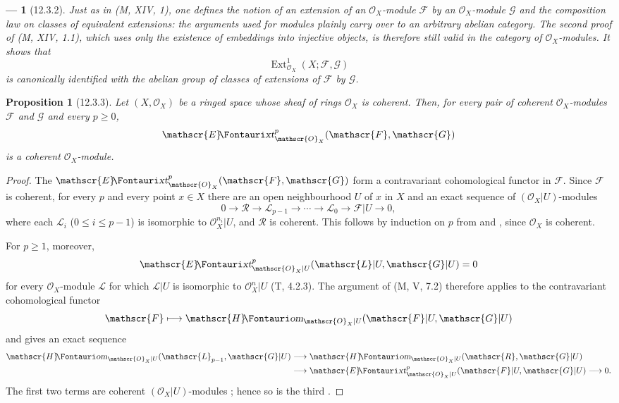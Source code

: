 \documentclass[oneside]{amsart}
\theoremstyle{ega-env-style}
\newtheorem*{env}{---}
\theoremstyle{ega-thm-env-style}
\newtheorem*{proposition}{Proposition}
\theoremstyle{ega-defn-env-style}
\def\mathcal{\mathscr}
\def\sh{\mathcal}                   %
\def\leq{\leqslant}                 %
\def\geq{\geqslant}                 %
\def\Ext{\operatorname{Ext}}
\def\shHom{\sh{H}\textup{\kern-2.2pt{\Fontauri\slshape om}}}   %
\def\shExt{\sh{E}\textup{\kern-2.2pt{\Fontauri\slshape xt}}}   %
\let\EGAOriginalLabel\label
\renewcommand{\label}[1]{\phantomsection\EGAOriginalLabel{#1}}
\begin{document}
\begin{env}[12.3.2]
\label{0.12.3.2}
Just as in (M, XIV, 1), one defines the notion of an
\emph{extension} of an $\sh{O}_X$-module $\sh{F}$ by an
$\sh{O}_X$-module $\sh{G}$ and the composition law on classes of
equivalent extensions: the arguments used for modules plainly carry
over to an arbitrary abelian category.
The second proof of (M, XIV, 1.1), which uses only the existence of
embeddings into injective objects, is therefore still valid in the
category of $\sh{O}_X$-modules.  It shows that
\[
  \Ext^1_{\sh{O}_X}(X;\sh{F},\sh{G})
\]
is canonically identified with the abelian group of classes of
extensions of $\sh{F}$ by $\sh{G}$.
\end{env}

\begin{proposition}[12.3.3]
\label{0.12.3.3}
Let $(X,\sh{O}_X)$ be a ringed space whose sheaf of rings
$\sh{O}_X$ is coherent.
Then, for every pair of coherent $\sh{O}_X$-modules $\sh{F}$ and
$\sh{G}$ and every $p\geq0$,
\[
  \shExt^p_{\sh{O}_X}(\sh{F},\sh{G})
\]
is a coherent $\sh{O}_X$-module.
\end{proposition}

\begin{proof}
The $\shExt^p_{\sh{O}_X}(\sh{F},\sh{G})$ form a contravariant
cohomological functor in $\sh{F}$.
Since $\sh{F}$ is coherent, for every $p$ and every point $x\in X$
there are an open neighbourhood $U$ of $x$ in $X$ and an exact
sequence of $(\sh{O}_X|U)$-modules
\[
  0\longrightarrow\sh{R}\longrightarrow\sh{L}_{p-1}
  \longrightarrow\cdots\longrightarrow\sh{L}_0
  \longrightarrow\sh{F}|U\longrightarrow0,
\]
where each $\sh{L}_i$ ($0\leq i\leq p-1$) is isomorphic to
$\sh{O}_X^{n_i}|U$, and $\sh{R}$ is coherent.
This follows by induction on $p$ from
 and
, since $\sh{O}_X$ is coherent.

For $p\geq1$, moreover,
\[
  \shExt^p_{\sh{O}_X|U}(\sh{L}|U,\sh{G}|U)=0
\]
for every $\sh{O}_X$-module $\sh{L}$ for which $\sh{L}|U$ is
isomorphic to $\sh{O}_X^n|U$ (T, 4.2.3).
The argument of (M, V, 7.2) therefore applies to the contravariant
cohomological functor
\[
  \sh{F}\longmapsto
  \shHom_{\sh{O}_X|U}(\sh{F}|U,\sh{G}|U)
\]
and gives an exact sequence
\[
  \begin{aligned}
  \shHom_{\sh{O}_X|U}(\sh{L}_{p-1},\sh{G}|U)
  &\longrightarrow
  \shHom_{\sh{O}_X|U}(\sh{R},\sh{G}|U)\\
  &\longrightarrow
  \shExt^p_{\sh{O}_X|U}(\sh{F}|U,\sh{G}|U)
  \longrightarrow0.
  \end{aligned}
\]
The first two terms are coherent $(\sh{O}_X|U)$-modules
; hence so is the third
.
\end{proof}
\end{document}
